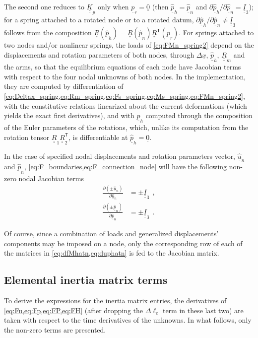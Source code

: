 \documentclass[12pt,a4paper,oneside,english]{abntex2} %
\newcommand{\fix}[1]{{\color{red}#1}}
\newcommand{\vect}[1]{\underline{#1}}
\newcommand{\del}[2]{\frac{\partial#1}{\partial#2}}
\def\tens#1{\underline{\underline{#1}}}
\def\lp{\left(}
\def\rp{\right)}
\def\T{\mathsf{T}}
\def\Ithree{\tens{I}_3}
\def\R{\tens{R}}
\def\u{\vect{u}}
\def\uhat{\widehat{\u}}
\def\p{\vect{p}}
\def\phat{\widehat{\p}}
\def\zv{\vect{0}}
\def\Deltal{\Delta \ell_e}
\begin{document}
\begin{apendicesenv}
\fix{The second one reduces to $\tens{K}_p$ only when $\p_r=\zv$ (then $\phat_h=\phat_n$ and $\partial\phat_h/\partial\phat_n=\Ithree$); for a spring attached to a rotated node or to a rotated datum, $\partial\phat_h/\partial\phat_n\neq\Ithree$ follows from the composition $\R\lp\phat_h\rp=\R\lp\phat_n\rp\R^\T\lp\p_r\rp$. For springs attached to two nodes and/or nonlinear springs, the loads of \cref{eq:FMn_spring2} depend on the displacements and rotation parameters of both nodes, through $\Delta\vect{x}$, $\phat_h$, $\R_m$ and the arms, so that the equilibrium equations of each node have Jacobian terms with respect to the four nodal unknowns of both nodes. In the implementation, they are computed by differentiation of \cref{eq:Deltax_spring,eq:Rm_spring,eq:Fs_spring,eq:Ms_spring,eq:FMn_spring2}, with the constitutive relations linearized about the current deformations (which yields the exact first derivatives), and with $\phat_h$ computed through the composition of the Euler parameters of the rotations, which, unlike its computation from the rotation tensor $\R_1\R_2^\T$, is differentiable at $\phat_h=\zv$.}

In the case of specified nodal displacements and rotation parameters vector, $\uhat_n$ and $\phat_n$,  \cref{eq:F_boundaries,eq:F_connection_node} will have the following non-zero nodal Jacobian terms
\begin{equation}
\begin{aligned}
    \del{\lp\pm\uhat_n\rp}{\uhat_n} &= \pm\Ithree \ \ ,
    \\
    \del{\lp\pm\phat_n\rp}{\phat_n} &= \pm\Ithree \ \ .
    \label{eq:duphatn}
\end{aligned}
\end{equation}

Of course, since a combination of loads and generalized displacements' components may be imposed on a node, only the corresponding row of each of the matrices in \cref{eq:dfMhatn,eq:duphatn} is fed to the Jacobian matrix.

\subsection{Elemental inertia matrix terms}

To derive the expressions for the inertia matrix entries, the derivatives of \cref{eq:Fu,eq:Fp,eq:FP,eq:FH} (after dropping the $\Deltal$ term in these last two) are taken with respect to the time derivatives of the unknowns. In what follows, only the non-zero terms are presented.


\end{apendicesenv}
\end{document}
